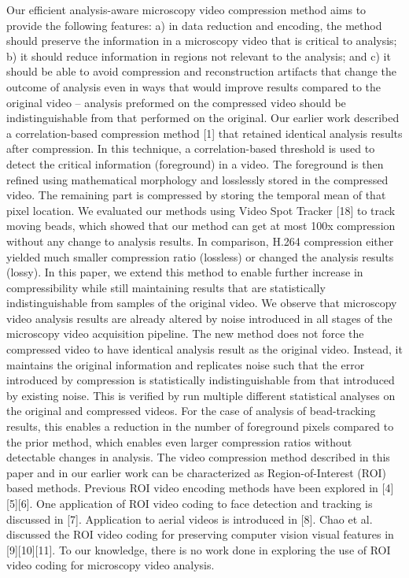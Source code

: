 Our efficient analysis-aware microscopy video compression method aims to provide the following features: a) in data reduction and encoding, the method should preserve the information in a microscopy video that is critical to analysis; b) it should reduce information in regions not relevant to the analysis; and c) it should be able to avoid compression and reconstruction artifacts that change the outcome of analysis even in ways that would improve results compared to the original video – analysis preformed on the compressed video should be indistinguishable from that performed on the original.
Our earlier work described a correlation-based compression method [1] that retained identical analysis results after compression. In this technique, a correlation-based threshold is used to detect the critical information (foreground) in a video. The foreground is then refined using mathematical morphology and losslessly stored in the compressed video. The remaining part is compressed by storing the temporal mean of that pixel location. We evaluated our methods using Video Spot Tracker [18] to track moving beads, which showed that our method can get at most 100x compression without any change to analysis results.  In comparison, H.264 compression either yielded much smaller compression ratio (lossless) or changed the analysis results (lossy).
In this paper, we extend this method to enable further increase in compressibility while still maintaining results that are statistically indistinguishable from samples of the original video. We observe that microscopy video analysis results are already altered by noise introduced in all stages of the microscopy video acquisition pipeline. The new method does not force the compressed video to have identical analysis result as the original video. Instead, it maintains the original information and replicates noise such that the error introduced by compression is statistically indistinguishable from that introduced by existing noise. This is verified by run multiple different statistical analyses on the original and compressed videos. For the case of analysis of bead-tracking results, this enables a reduction in the number of foreground pixels compared to the prior method, which enables even larger compression ratios without detectable changes in analysis.
The video compression method described in this paper and in our earlier work can be characterized as Region-of-Interest (ROI) based methods.  Previous ROI video encoding methods have been explored in [4][5][6]. One application of ROI video coding to face detection and tracking is discussed in [7]. Application to aerial videos is introduced in [8]. Chao et al. discussed the ROI video coding for preserving computer vision visual features in [9][10][11]. To our knowledge, there is no work done in exploring the use of ROI video coding for microscopy video analysis.

